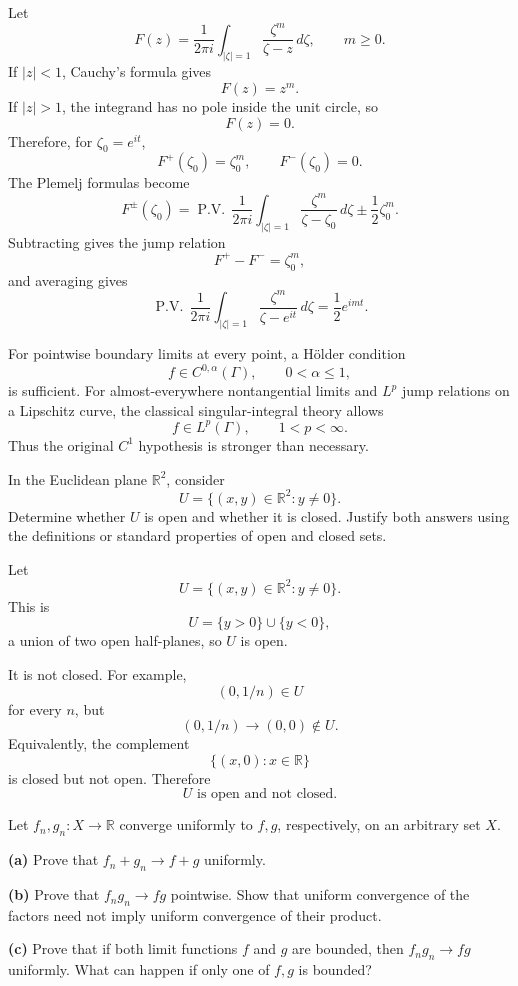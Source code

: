 

\begin{solution}
Let
\[
F(z)
=
\frac{1}{2\pi i}
\int_{|\zeta|=1}
\frac{\zeta^m}{\zeta-z}\,d\zeta,
\qquad m\ge0.
\]
If \(|z|<1\), Cauchy's formula gives
\[
F(z)=z^m.
\]
If \(|z|>1\), the integrand has no pole inside the unit circle, so
\[
F(z)=0.
\]
Therefore, for \(\zeta_0=e^{it}\),
\[
F^+(\zeta_0)=\zeta_0^m,
\qquad
F^-(\zeta_0)=0.
\]
The Plemelj formulas become
\[
F^\pm(\zeta_0)
=
\operatorname{P.V.}\,
\frac{1}{2\pi i}
\int_{|\zeta|=1}
\frac{\zeta^m}{\zeta-\zeta_0}\,d\zeta
\pm\frac12\zeta_0^m.
\]
Subtracting gives the jump relation
\[
F^+-F^-=\zeta_0^m,
\]
and averaging gives
\[
\boxed{
\operatorname{P.V.}\,
\frac{1}{2\pi i}
\int_{|\zeta|=1}
\frac{\zeta^m}{\zeta-e^{it}}\,d\zeta
=
\frac12e^{imt}.
}
\]

For pointwise boundary limits at every point, a Hölder condition
\[
f\in C^{0,\alpha}(\Gamma),
\qquad 0<\alpha\le1,
\]
is sufficient. For almost-everywhere nontangential limits and \(L^p\) jump relations on a Lipschitz curve, the classical singular-integral theory allows
\[
f\in L^p(\Gamma),
\qquad 1<p<\infty.
\]
Thus the original \(C^1\) hypothesis is stronger than necessary.
\end{solution}


\begin{problem}[CP-IV-0026]
\label{prob:cp-iv-0026}
In the Euclidean plane $\mathbb R^2$, consider
\[
U=\{(x,y)\in\mathbb R^2:y\ne0\}.
\]
Determine whether $U$ is open and whether it is closed. Justify both answers using the definitions or standard properties of open and closed sets.
\end{problem}

\begin{solution}
Let
\[
U=\{(x,y)\in\mathbb R^2:y\neq0\}.
\]
This is
\[
U=\{y>0\}\cup\{y<0\},
\]
a union of two open half-planes, so \(U\) is open.

It is not closed. For example,
\[
(0,1/n)\in U
\]
for every \(n\), but
\[
(0,1/n)\longrightarrow(0,0)\notin U.
\]
Equivalently, the complement
\[
\{(x,0):x\in\mathbb R\}
\]
is closed but not open. Therefore
\[
\boxed{U\text{ is open and not closed}.}
\]
\end{solution}


\begin{problem}[CP-IV-0028]
\label{prob:cp-iv-0028}
Let $f_n,g_n:X\to\mathbb R$ converge uniformly to $f,g$, respectively, on an arbitrary set $X$.

\par\noindent\textbf{(a)} Prove that $f_n+g_n\to f+g$ uniformly.

\par\noindent\textbf{(b)} Prove that $f_ng_n\to fg$ pointwise. Show that uniform convergence
of the factors need not imply uniform convergence of their product.

\par\noindent\textbf{(c)} Prove that if both limit functions $f$ and $g$ are bounded,
then $f_ng_n\to fg$ uniformly. What can happen if only one of $f,g$ is bounded?
\end{problem}

